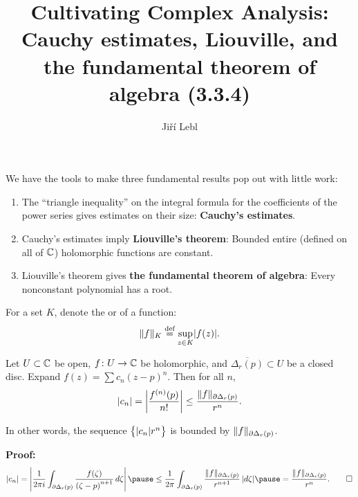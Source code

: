 \documentclass[10pt,aspectratio=169]{beamer}
\author{Ji\v{r}\'i Lebl}
\institute[OSU]{%
Departemento pri Matematiko de Oklahoma {\^S}tata Universitato}
\title{Cultivating Complex Analysis:\\%
Cauchy estimates, Liouville, and\\%
the fundamental theorem of algebra (3.3.4)}
\date{}
\begin{document}
\begin{frame}
\titlepage
\end{frame}

\begin{frame}
We have the tools to make three fundamental results pop out with little
work:

\begin{enumerate}
\pause
\item
The ``triangle inequality'' on the integral formula
for the coefficients of the power series
gives estimates on their size: \textbf{Cauchy's estimates}.

\pause
\item
Cauchy's estimates imply \textbf{Liouville's theorem}: Bounded entire (defined on all
of ${\mathbb{C}}$) holomorphic functions are constant.

\pause
\item
Liouville's theorem gives \textbf{the fundamental theorem of algebra}:
Every nonconstant polynomial has a root.
\end{enumerate}

\end{frame}

\begin{frame}
For a set $K$, denote the \emph{} or
\emph{} of a function:
\begin{equation*}
\lVert {f} \rVert_K
\overset{\text{def}}{=}
\sup_{z \in K} \lvert {f(z)} \rvert .
\end{equation*}

\pause

\begin{theorem}
Let $U \subset {\mathbb{C}}$ be open, $f \colon U \to {\mathbb{C}}$ be
holomorphic, and $\overline{\Delta_r(p)} \subset U$
be a closed disc.  Expand $f(z) = \sum c_n {(z-p)}^n$.
\pause
Then for all $n$,
\[
\lvert {c_n} \rvert =
\left\lvert {\frac{f^{(n)}(p)}{n!}} \right\rvert
\leq
\frac{\lVert {f} \rVert_{\partial \Delta_r(p)}}{r^{n}} .
\]
\end{theorem}

\pause

In other words, the sequence $\bigl\{ \lvert {c_n} \rvert r^n \bigr\}$ is bounded by
$\lVert {f} \rVert_{\partial \Delta_r(p)}$.

\medskip
\pause

\textbf{Proof:}
\[
\sabs{c_n}  = 
\abs{
\frac{1}{2\pi i}
\int_{\partial \Delta_r(p)}
\frac{f(\zeta)}{{(\zeta-p)}^{n+1}}
\,
d \zeta 
}
\pause
\leq
\frac{1}{2\pi}
\int_{\partial \Delta_r(p)}
\frac{\snorm{f}_{\partial \Delta_r(p)}}{r^{n+1}}
\,
\sabs{d \zeta} 
\pause
=
\frac{\snorm{f}_{\partial \Delta_r(p)}}{r^{n}} .
\qed
\]

\end{frame}
\end{document}
